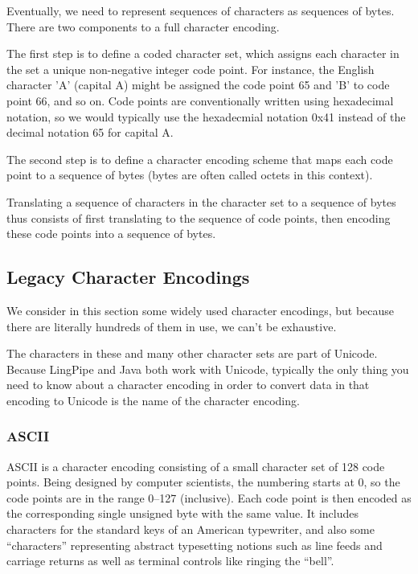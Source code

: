 Eventually, we need to represent sequences of characters as sequences
of bytes.  There are two components to a full character encoding.

The first step is to define a coded character set, which assigns each
character in the set a unique non-negative integer code point.  For
instance, the English character 'A' (capital A) might be assigned the
code point 65 and 'B' to code point 66, and so on.  Code points are
conventionally written using hexadecimal notation, so we would
typically use the hexadecmial notation 0x41 instead of the decimal
notation 65 for capital A.

The second step is to define a character encoding scheme that maps
each code point to a sequence of bytes (bytes are often called octets
in this context).

Translating a sequence of characters in the character set to a
sequence of bytes thus consists of first translating to the sequence
of code points, then encoding these code points into a sequence of
bytes.


\subsection{Legacy Character Encodings}

We consider in this section some widely used character encodings, but
because there are literally hundreds of them in use, we can't be
exhaustive.  

The characters in these and many other character sets are part of
Unicode.  Because LingPipe and Java both work with Unicode, typically
the only thing you need to know about a character encoding in order
to convert data in that encoding to Unicode is the name of the
character encoding.

\subsubsection{ASCII}

ASCII is a character encoding consisting of a small character set of
128 code points.  Being designed by computer scientists, the numbering
starts at 0, so the code points are in the range 0--127 (inclusive).
Each code point is then encoded as the corresponding single unsigned
byte with the same value.  It includes characters for the standard
keys of an American typewriter, and also some ``characters''
representing abstract typesetting notions such as line feeds and
carriage returns as well as terminal controls like ringing the
``bell''.

